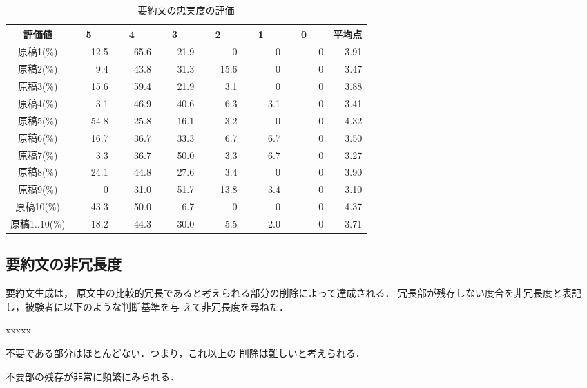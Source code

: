 \begin{table}[tbp]
 \begin{center}
  \caption{要約文の忠実度の評価}
  \label{table:p_chujitsudo}
  \begin{tabular}{|c||r|r|r|r|r|r||r|}\hline
   評価値    &\ \ 5\ \ \ 
             &\ \ 4\ \ \
             &\ \ 3\ \ \
             &\ \ 2\ \ \
             &\ \ 1\ \ \
             &\ \ 0\ \ \
             & 平均点 \\
   \hline \hline
   
   原稿1(\%) & 12.5 & 65.6 & 21.9 &    0 &    0 &    0 & 3.91 \\
   原稿2(\%) &  9.4 & 43.8 & 31.3 & 15.6 &    0 &    0 & 3.47 \\
   原稿3(\%) & 15.6 & 59.4 & 21.9 &  3.1 &    0 &    0 & 3.88 \\
   原稿4(\%) &  3.1 & 46.9 & 40.6 &  6.3 &  3.1 &    0 & 3.41 \\
   原稿5(\%) & 54.8 & 25.8 & 16.1 &  3.2 &    0 &    0 & 4.32 \\
   原稿6(\%) & 16.7 & 36.7 & 33.3 &  6.7 &  6.7 &    0 & 3.50 \\
   原稿7(\%) &  3.3 & 36.7 & 50.0 &  3.3 &  6.7 &    0 & 3.27 \\
   原稿8(\%) & 24.1 & 44.8 & 27.6 &  3.4 &    0 &    0 & 3.90 \\
   原稿9(\%) &    0 & 31.0 & 51.7 & 13.8 &  3.4 &    0 & 3.10 \\
   原稿10(\%)& 43.3 & 50.0 &  6.7 &    0 &    0 &    0 & 4.37 \\
   \hline
   原稿1..10(\%)
             & 18.2 & 44.3 & 30.0 &  5.5 &  2.0 &    0 & 3.71 \\
   \hline
  \end{tabular}
 \end{center}
\end{table}


\subsection{要約文の非冗長度}
\label{section:hijochodo}

要約文生成は，
原文中の比較的冗長であると考えられる部分の削除によって達成される．
冗長部が残存しない度合を非冗長度と表記し，被験者に以下のような判断基準を与
えて非冗長度を尋ねた．
\begin{itemize}
\end{itemize}

